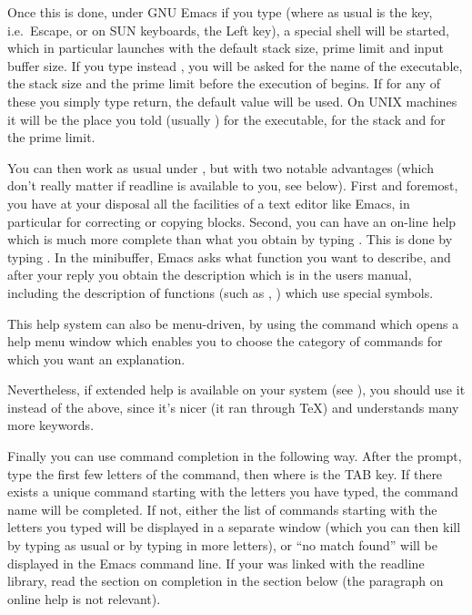 Once this is done, under GNU Emacs if you type  (where as usual
 is the  key, i.e.~Escape, or on SUN keyboards, the Left
key), a special shell will be started, which in particular launches  with
the default stack size, prime limit and input buffer size. If you type
instead , you will be asked for the name of the 
executable, the stack size and the prime limit before the execution of
begins. If for any of these you simply type return, the default value will
be used. On UNIX machines it will be the place you told 
(usually ) for the executable,  for the
stack and  for the prime limit.

\smallskip
  You can then work as usual under , but with two notable advantages (which
don't really matter if readline is available to you, see below). First and
foremost, you have at your disposal all the facilities of a text editor like
Emacs, in particular for correcting or copying blocks. Second, you can have
an on-line help which is much more complete than what you obtain by typing
. This is done by typing . In the minibuffer, Emacs asks
what function you want to describe, and after your reply you obtain the
description which is in the users manual, including the description of
functions (such as \kbd{\bs}, \kbd{\%}) which use special symbols.

  This help system can also be menu-driven, by using the command
 which opens a help menu window which enables you to choose
the category of commands for which you want an explanation.

  Nevertheless, if extended help is available on your system (see
), you should use it instead of the above, since it's
nicer (it ran through \TeX) and understands many more keywords.

  Finally you can use command completion in the following way. After the
prompt, type the first few letters of the command, then  where
 is the TAB key. If there exists a unique command starting with
the letters you have typed, the command name will be completed. If not,
either the list of commands starting with the letters you typed will be
displayed in a separate window (which you can then kill by typing as usual
 or by typing in more letters), or ``no match found'' will be
displayed in the Emacs command line. If your  was linked with the readline
library, read the section on completion in the section below (the paragraph
on online help is not relevant).

